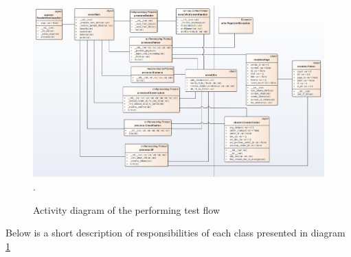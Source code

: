 \begin{figure}[H]
	\begin{center}
		\includegraphics[width=1.0\linewidth]{images/diagrams/class.png}.
		\caption{Activity diagram of the performing test flow}
		\label{design-class-diagram}
	\end{center}
\end{figure}

Below is a short description of responsibilities of each class presented in diagram \ref{design-class-diagram}

